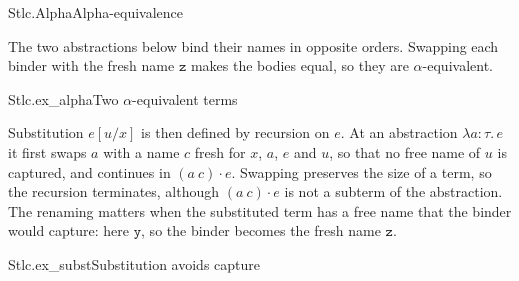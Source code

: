\documentclass{article}
\begin{document}
\begin{leanrules}[sum=G1XetiAjYO]{Stlc.Alpha}{Alpha-equivalence}
\end{leanrules}

The two abstractions below bind their names in opposite orders. Swapping each
binder with the fresh name $\mathtt{z}$ makes the bodies equal, so they are
$\alpha$-equivalent.

\begin{leanexample}[sum=WD7KrnrOnA]{Stlc.ex_alpha}{Two $\alpha$-equivalent terms}
\label{ex:Stlc.ex_alpha}
\end{leanexample}

Substitution $e[u/x]$ is then defined by recursion on $e$. At an abstraction
$\lambda a{:}\tau.\, e$ it first swaps $a$ with a name $c$ fresh for $x$,
$a$, $e$ and $u$, so that no free name of $u$ is captured, and continues in
$(a\ c) \cdot e$. Swapping preserves the size of a
term, so the recursion terminates, although
$(a\ c) \cdot e$ is not a subterm of the abstraction. The renaming matters
when the substituted term has a free name that the binder would capture: here
$\mathtt{y}$, so the binder becomes the fresh name $\mathtt{z}$.

\begin{leanexample}[sum=RfRJkVYbYV]{Stlc.ex_subst}{Substitution avoids capture}
\label{ex:Stlc.ex_subst}
\end{leanexample}
\end{document}
